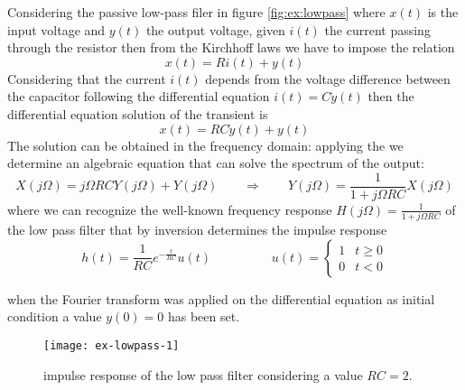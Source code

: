 		Considering the passive low-pass filer in figure \ref{fig:ex:lowpass} where $x(t)$ is the input voltage and $y(t)$ the output voltage, given $i(t)$ the current passing through the resistor then from the Kirchhoff laws we have to impose the relation
		\[ x(t) = Ri(t) + y(t) \]
		Considering that the current $i(t)$ depends from the voltage difference between the capacitor following the differential equation $i(t) = C\dot y(t)$ then the differential equation solution of the transient is
		\[ x(t) = RC \dot y(t) + y(t) \]
		The solution can be obtained in the frequency domain: applying the \ctft we determine an algebraic equation that can solve the spectrum of the output:
		\[ X(j\Omega) = j\Omega RC Y(j\Omega) + Y(j\Omega) \qquad \Rightarrow \qquad Y(j\Omega) = \frac 1{1 + j\Omega RC} X(j\Omega)\]
		where we can recognize the well-known frequency response $H(j\Omega) = \frac 1{1 + j\Omega RC}$ of the low pass filter that by inversion determines the impulse response
		\[ h(t) = \frac 1{RC} e^{-\frac{t}{RC}} u(t) \hspace{2cm} u(t) = \begin{cases}
			1 & t\geq 0 \\ 0 & t < 0
		\end{cases} \]
		\begin{note}
			when the Fourier transform was applied on the differential equation as initial condition a value $y(0)= 0$ has been set.
		\end{note}
		\begin{SCfigure}[2][bht]
			\centering \texttt{[image: ex-lowpass-1]}
			\caption{impulse response of the low pass filter considering a value $RC=2$.}
		\end{SCfigure}
		
